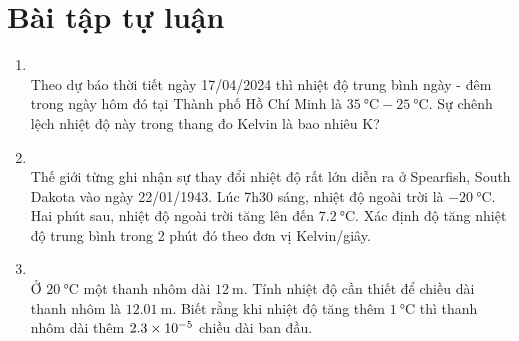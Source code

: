 \section{Bài tập tự luận}
\begin{enumerate}[label=\bfseries Câu \arabic*:, leftmargin=1.7cm]
	\item{}\\
	 Theo dự báo thời tiết ngày 17/04/2024 thì nhiệt độ trung bình ngày - đêm trong
	ngày hôm đó tại Thành phố Hồ Chí Minh là  $\SI{35}{\celsius}-\SI{25}{\celsius}$. Sự chênh lệch nhiệt độ này trong thang đo Kelvin là bao nhiêu $\si{\kelvin}$?

\item{}\\ 
Thế giới từng ghi nhận sự thay đổi nhiệt độ rất lớn diễn ra ở Spearfish, South Dakota vào ngày 22/01/1943. Lúc 7h30 sáng, nhiệt độ ngoài trời là $\SI{-20}{\celsius}$. Hai phút sau, nhiệt độ ngoài trời tăng lên đến $\SI{7.2}{\celsius}$. Xác định độ tăng nhiệt độ trung bình trong 2 phút đó theo đơn vị Kelvin/giây.
\item {}\\
Ở $\SI{20}{\celsius}$ một thanh nhôm dài $\SI{12}{\meter}$. Tính nhiệt độ cần thiết để chiều dài thanh nhôm là $\SI{12.01}{\meter}$. Biết rằng khi nhiệt độ tăng thêm $\SI{1}{\celsius}$ thì thanh nhôm dài thêm $\SI{2.3E-5}{}$ chiều dài ban đầu.


\end{enumerate}
